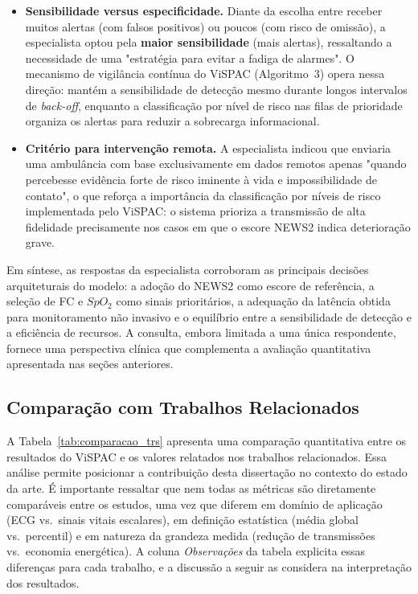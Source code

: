 \documentclass[twoside,english,brazilian]{UNISINOSmonografia}
\begin{document}
\begin{itemize}
\item \textbf{Sensibilidade versus especificidade.} Diante da escolha entre receber muitos alertas (com falsos positivos) ou poucos (com risco de omissão), a especialista optou pela \textbf{maior sensibilidade} (mais alertas), ressaltando a necessidade de uma "estratégia para evitar a fadiga de alarmes". O mecanismo de vigilância contínua do ViSPAC (Algoritmo~3) opera nessa direção: mantém a sensibilidade de detecção mesmo durante longos intervalos de \textit{back-off}, enquanto a classificação por nível de risco nas filas de prioridade organiza os alertas para reduzir a sobrecarga informacional.

\item \textbf{Critério para intervenção remota.} A especialista indicou que enviaria uma ambulância com base exclusivamente em dados remotos apenas "quando percebesse evidência forte de risco iminente à vida e impossibilidade de contato", o que reforça a importância da classificação por níveis de risco implementada pelo ViSPAC: o sistema prioriza a transmissão de alta fidelidade precisamente nos casos em que o escore NEWS2 indica deterioração grave.
\end{itemize}

Em síntese, as respostas da especialista corroboram as principais decisões arquiteturais do modelo: a adoção do NEWS2 como escore de referência, a seleção de FC e $SpO_2$ como sinais prioritários, a adequação da latência obtida para monitoramento não invasivo e o equilíbrio entre a sensibilidade de detecção e a eficiência de recursos. A consulta, embora limitada a uma única respondente, fornece uma perspectiva clínica que complementa a avaliação quantitativa apresentada nas seções anteriores.

\subsection{Comparação com Trabalhos Relacionados}
A Tabela~\ref{tab:comparacao_trs} apresenta uma comparação quantitativa entre os resultados do ViSPAC e os valores relatados nos trabalhos relacionados. Essa análise permite posicionar a contribuição desta dissertação no contexto do estado da arte. É importante ressaltar que nem todas as métricas são diretamente comparáveis entre os estudos, uma vez que diferem em domínio de aplicação (ECG vs.\ sinais vitais escalares), em definição estatística (média global vs.\ percentil) e em natureza da grandeza medida (redução de transmissões vs.\ economia energética). A coluna \textit{Observações} da tabela explicita essas diferenças para cada trabalho, e a discussão a seguir as considera na interpretação dos resultados.
\end{document}
